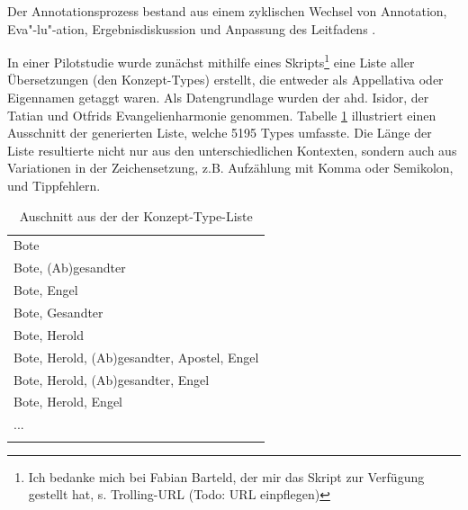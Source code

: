 Der Annotationsprozess bestand aus einem zyklischen Wechsel von Annotation, Eva"-lu"-ation, Ergebnisdiskussion und Anpassung des Leitfadens \parencite[entsprechend dem aus der Computerlinguistik bekannten  (=\,), beschrieben u.a. in][109]{Pustejovsky2012}.

In einer Pilotstudie wurde zunächst mithilfe eines Skripts\footnote{Ich bedanke mich bei Fabian Barteld, der mir das Skript  zur Verfügung gestellt hat, s. Trolling-URL (Todo: URL einpflegen)}  eine Liste aller Übersetzungen (den Konzept-Types) erstellt, die entweder als Appellativa oder Eigennamen getaggt waren. Als Datengrundlage wurden der ahd. Isidor, der Tatian und Otfrids Evangelienharmonie genommen.  
Tabelle \ref{tab:konzept-types} illustriert einen Ausschnitt der generierten Liste, welche 5195 Types umfasste. Die Länge der Liste resultierte nicht nur aus den unterschiedlichen Kontexten, sondern auch aus Variationen in der Zeichensetzung, z.B. Aufzählung mit Komma oder Semikolon, und Tippfehlern.  

\begin{table}
\centering
\begin{tabular}{l}
\lsptoprule
\multicolumn{1}{c}{Übersetzung (Konzept-Type)}    \\ \midrule
Bote                                        \\
Bote, (Ab)gesandter                         \\
Bote, Engel                                 \\
Bote, Gesandter                             \\
Bote, Herold                                \\
Bote, Herold, (Ab)gesandter, Apostel, Engel \\
Bote, Herold, (Ab)gesandter, Engel          \\
Bote, Herold, Engel                         \\
...                                         \\ \lspbottomrule
\end{tabular}
\caption{Auschnitt aus der der Konzept-Type-Liste\label{tab:konzept-types}}
\end{table}

